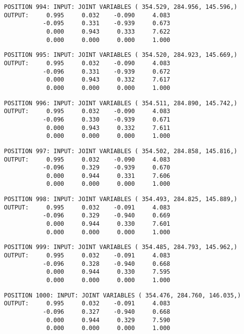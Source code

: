 \begin{verbatim}
POSITION 994: INPUT: JOINT VARIABLES ( 354.529, 284.956, 145.596,)
OUTPUT:     0.995     0.032    -0.090     4.083
           -0.095     0.331    -0.939     0.673
            0.000     0.943     0.333     7.622
            0.000     0.000     0.000     1.000
\end{verbatim} \pagebreak[1]\begin{verbatim}
POSITION 995: INPUT: JOINT VARIABLES ( 354.520, 284.923, 145.669,)
OUTPUT:     0.995     0.032    -0.090     4.083
           -0.096     0.331    -0.939     0.672
            0.000     0.943     0.332     7.617
            0.000     0.000     0.000     1.000
\end{verbatim} \pagebreak[1]\begin{verbatim}
POSITION 996: INPUT: JOINT VARIABLES ( 354.511, 284.890, 145.742,)
OUTPUT:     0.995     0.032    -0.090     4.083
           -0.096     0.330    -0.939     0.671
            0.000     0.943     0.332     7.611
            0.000     0.000     0.000     1.000
\end{verbatim} \pagebreak[1]\begin{verbatim}
POSITION 997: INPUT: JOINT VARIABLES ( 354.502, 284.858, 145.816,)
OUTPUT:     0.995     0.032    -0.090     4.083
           -0.096     0.329    -0.939     0.670
            0.000     0.944     0.331     7.606
            0.000     0.000     0.000     1.000
\end{verbatim} \pagebreak[1]\begin{verbatim}
POSITION 998: INPUT: JOINT VARIABLES ( 354.493, 284.825, 145.889,)
OUTPUT:     0.995     0.032    -0.091     4.083
           -0.096     0.329    -0.940     0.669
            0.000     0.944     0.330     7.601
            0.000     0.000     0.000     1.000
\end{verbatim} \pagebreak[1]\begin{verbatim}
POSITION 999: INPUT: JOINT VARIABLES ( 354.485, 284.793, 145.962,)
OUTPUT:     0.995     0.032    -0.091     4.083
           -0.096     0.328    -0.940     0.668
            0.000     0.944     0.330     7.595
            0.000     0.000     0.000     1.000
\end{verbatim} \pagebreak[1]\begin{verbatim}
POSITION 1000: INPUT: JOINT VARIABLES ( 354.476, 284.760, 146.035,)
OUTPUT:     0.995     0.032    -0.091     4.083
           -0.096     0.327    -0.940     0.668
            0.000     0.944     0.329     7.590
            0.000     0.000     0.000     1.000
\end{verbatim} \pagebreak[1]\begin{verbatim}

\end{verbatim}
